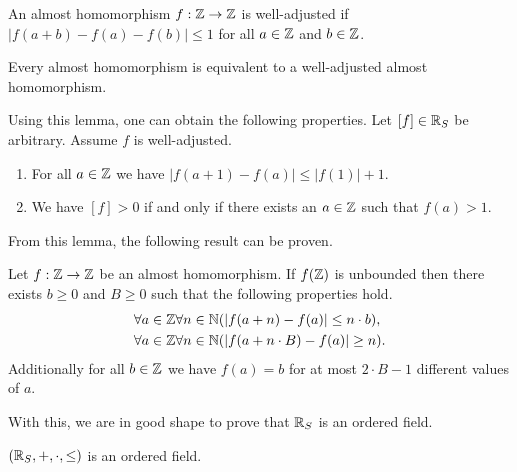 \documentclass[../main.tex]{subfiles}
\begin{document}
\begin{definition}
    An almost homomorphism $f:\mathbb{Z}\to\mathbb{Z}$ is well-adjusted if $\vert f(a+b)-f(a)-f(b)\vert\leq1$ for all $a\in\mathbb{Z}$ and $b\in\mathbb{Z}$.
\end{definition}
\begin{lemma}\label{lma:the_real_numbers:concentration_lemma}
    Every almost homomorphism is equivalent to a well-adjusted almost homomorphism.
\end{lemma}
Using this lemma, one can obtain the following properties. Let $[f]\in\mathbb{R}_S$ be arbitrary. Assume $f$ is well-adjusted.
\begin{enumerate}
    \item For all $a\in\mathbb{Z}$ we have $\vert f(a+1)-f(a)\vert\leq\vert f(1)\vert+1$.
    \item We have $[f]>0$ if and only if there exists an $a\in\mathbb{Z}$ such that $f(a)>1$.
\end{enumerate}
From this lemma, the following result can be proven.
\begin{lemma}\label{lma:the_real_numbers:almost_homomorphism_each_value_finitely_often}
    Let $f:\mathbb{Z}\to\mathbb{Z}$ be an almost homomorphism. If $f(\mathbb{Z})$ is unbounded then there exists $b\geq0$ and $B\geq0$ such that the following properties hold.
    \begin{align*}
        & \forall a\in\mathbb{Z}\forall n\in\mathbb{N}(\vert f(a+n)-f(a)\vert\leq n\cdot b), \\
        & \forall a\in\mathbb{Z}\forall n\in\mathbb{N}(\vert f(a+n\cdot B)-f(a)\vert\geq n).
    \end{align*}
    Additionally for all $b\in\mathbb{Z}$ we have $f(a)=b$ for at most $2\cdot B-1$ different values of $a$.
\end{lemma}
With this, we are in good shape to prove that $\mathbb{R}_S$ is an ordered field.
\begin{proposition}\label{prp:the_real_numbers:schanuel_ordered_field_real_numbers}
    $(\mathbb{R}_S,+,\cdot,\leq)$ is an ordered field.
\end{proposition}
\end{document}
